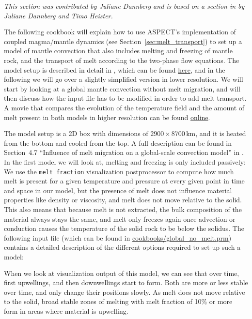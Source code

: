 \documentclass{article}
\newcommand{\aspect}{\textsc{ASPECT}}
\begin{document}
\textit{This section was contributed by Juliane Dannberg and is based on a section in \cite{dannberg_melt} by Juliane Dannberg and Timo Heister.}

The following cookbook will explain how to use \aspect{}'s implementation of coupled magma/mantle dynamics
(see Section~\ref{sec:melt_transport}) to set up a model of mantle convection that also includes melting
and freezing of mantle rock, and the transport of melt according to the two-phase flow equations.
The model setup is described in detail in \cite{dannberg_melt}, which can be found \href{https://doi.org/10.1093/gji/ggw329}{here},
and in the following we will go over a slightly simplified version in lower resolution.
We will start by looking at a global mantle convection without melt migration, and will
then discuss how the input file has to be modified in order to add melt transport. A movie that compares
the evolution of the temperature field and the amount of melt present in both models in higher resolution can be found
\href{http://youtu.be/Kwyp4Jvx6MU}{online}.

The model setup is a 2D box with dimensions of $2900 \times 8700$\,km, and it is heated from the bottom and
cooled from the top. A full description can be found in Section~4.7 ``Influence of melt migration on a global-scale
convection model'' in \cite{dannberg_melt}.
In the first model we will look at, melting and freezing is only included passively: We use the \texttt{melt fraction} visualization postprocessor to compute how much melt is present for a given temperature and pressure at every given point in time and space in our model, but the presence of melt does not influence material properties like density or viscosity, and melt does not move relative to the solid. This also means that because melt is not extracted, the bulk composition of the material always stays the same, and melt only freezes again once advection or conduction causes the temperature of the solid rock to be below the solidus.
The following input file (which can be found in \url{cookbooks/global_no_melt.prm}) contains a detailed description of the
different options required to set up such a model:



When we look at visualization output of this model, we can see that over time, first upwellings, and then downwellings start to form. Both are more or less stable over time, and only change their positions slowly. As melt does not move relative to the solid, broad stable zones of melting with melt fraction of 10\% or more form in areas where material is upwelling.
\end{document}
